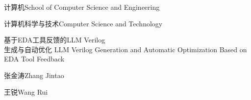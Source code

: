 
\school
{计算机}{School of Computer Science and Engineering}

\major
{计算机科学与技术}{Computer Science and Technology}

\thesistitle
{基于EDA工具反馈的LLM Verilog\\ 生成与自动优化}
{}
{LLM Verilog Generation and Automatic Optimization Based on EDA Tool Feedback}
{}

\thesisauthor
{张金涛}{Zhang Jintao}

\teacher
{王锐}{Wang Rui}






